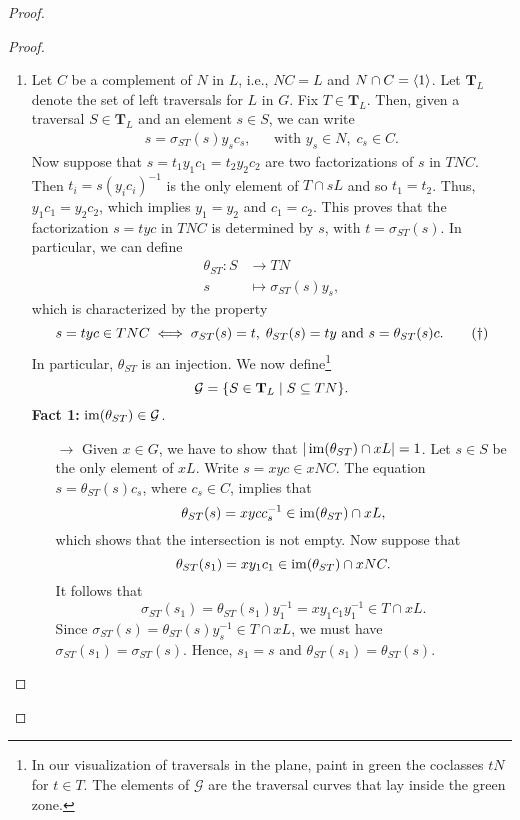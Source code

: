 \begin{solution}
\begin{proof}
\begin{proof}${}$
\begin{enumerate}[\rm a)]
    \item Let $C$ be a complement of $N$ in $L$, i.e., $NC=L$ and $N\cap C=\langle1\rangle$. Let $\mathbf T_L$ denote the set of left traversals for $L$ in $G$. Fix $T\in\mathbf T_L$. Then, given a traversal $S\in\mathbf T_L$ and an element $s\in S$, we can write
    \begin{align}\label{eq.g1}
        s = \sigma_{ST}(s)y_sc_s,  &&\text{with }y_s\in N,\;c_s\in C.
    \end{align}
    Now suppose that $s=t_1y_1c_1=t_2y_2c_2$ are two factorizations of $s$ in $TNC$. Then $t_i=s(y_ic_i)^{-1}$ is the only element of $T\cap sL$ and so $t_1=t_2$. Thus, $y_1c_1=y_2c_2$, which implies $y_1=y_2$ and $c_1=c_2$. This proves that the factorization $s=tyc$ in $TNC$ is determined by $s$, with $t=\sigma_{ST}(s)$. In particular, we can define
    \begin{align}\label{eq.g2}
        \theta_{ST}\colon S&\to TN\\
        s&\mapsto\sigma_{ST}(s)y_s,\nonumber
    \end{align}
    which is characterized by the property
    \begin{equation}\label{eq.g3}
        s=tyc\in TNC \iff \sigma_{ST}(s)=t,\;\theta_{ST}(s)=ty \text{ and }s=\theta_{ST}(s)c.\tag{\text{$\dag$}}
    \end{equation}
    In particular, $\theta_{ST}$ is an injection. We now define\footnote{In our visualization of traversals in the plane, paint in green the coclasses $tN$ for $t\in T$. The elements of $\mathcal G$ are the traversal curves that lay inside the green zone.}
    $$
        \mathcal G = \{S\in\mathbf T_L\mid S\subseteq TN\}.
    $$
    \textbf{Fact 1:} $\operatorname{im}(\theta_{ST})\in\mathcal G$.
    
    {\small
    \begin{enumerate}
        \item[$\to$]
    Given $x\in G$, we have to show that $|\operatorname{im}(\theta_{ST})\cap xL|=1$. Let $s\in S$ be the only element of $xL$. Write $s=xyc\in xNC$. The equation $s=\theta_{ST}(s)c_s$, where $c_s\in C$, implies that
    $$
        \theta_{ST}(s)=xycc_s^{-1}\in\operatorname{im}(\theta_{ST})\cap xL,
    $$
    which shows that the intersection is not empty. Now suppose that
    $$
        \theta_{ST}(s_1)=xy_1c_1\in \operatorname{im}(\theta_{ST})\cap xNC.
    $$
    It follows that
    $$
        \sigma_{ST}(s_1) = \theta_{ST}(s_1)y_1^{-1}=xy_1c_1y_1^{-1}\in T\cap xL.
    $$
    Since $\sigma_{ST}(s)=\theta_{ST}(s)y_s^{-1}\in T\cap xL$, we must have $\sigma_{ST}(s_1)=\sigma_{ST}(s)$. Hence, $s_1=s$ and $\theta_{ST}(s_1)=\theta_{ST}(s)$.
    \end{enumerate}
    }


\end{enumerate}
\end{proof}
\end{proof}
\end{solution}
